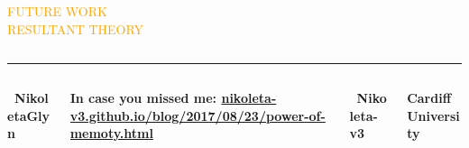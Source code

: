 \documentclass[usenames,dvipsnames,t]{beamer}
\begin{document}
\begin{columns}
\begin{column}{.2\linewidth}
\begin{center}
            \begin{center}
                \textcolor{orange}{\Large{FUTURE WORK}} \\
                \textcolor{orange}{\small{RESULTANT THEORY}}
            \end{center}
        \begin{center}
            
        \end{center}
        \end{center}
    \end{column}
\end{columns}
\vspace{0.3cm}

\hrule height 3pt
\begin{columns}
    \begin{column}{.1\linewidth}

        \centering
        \textbf{ \faTwitter \ NikoletaGlyn}
    \end{column}
    \begin{column}{.55\linewidth}

        \centering
        \textbf{ In case you missed me: \url{nikoleta-v3.github.io/blog/2017/08/23/power-of-memoty.html}}
    \end{column}
    \begin{column}{.1\linewidth}

        \centering
        \textbf{ \faGithub \ Nikoleta-v3}
    \end{column}
    \begin{column}{.1\linewidth}

        \centering
        \textbf{Cardiff University}
    \end{column}
\end{columns}
\end{document}
